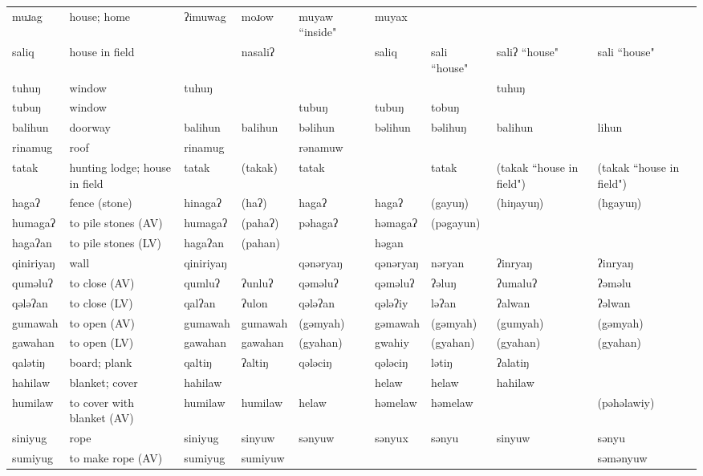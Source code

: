 \begin{landscape}
\begin{longtable}{*{9}{>{\raggedright\arraybackslash}p{}}}
\text{*}muɹag & house; home & ʔimuwag & moɹow & muyaw ``inside" & muyax &  &  & \\
\text{*}saliq & house in field &  & nasaliʔ &  & saliq & sali ``house" & saliʔ ``house" & sali ``house"\\
\text{*}tuhuŋ & window & tuhuŋ &  &  &  &  & tuhuŋ & \\
\text{*}tubuŋ & window &  &  & tubuŋ & tubuŋ & tobuŋ &  & \\
\text{*}balihun & doorway & balihun & balihun & bəlihun & bəlihun & bəlihuŋ & balihun & lihun\\
\text{*}rinamug & roof & rinamug &  & rənamuw &  &  &  & \\
\text{*}tatak & hunting lodge; house in field & tatak & (takak) & tatak &  & tatak & (takak ``house in field") & (takak ``house in field")\\
\text{*}hagaʔ & fence (stone) & hinagaʔ & (haʔ) & hagaʔ & hagaʔ & (gayuŋ) & (hiŋayuŋ) & (hgayuŋ)\\
\text{*}humagaʔ & to pile stones (AV) & humagaʔ & (pahaʔ) & pəhagaʔ & həmagaʔ & (pəgayun) &  & \\
\text{*}hagaʔan & to pile stones (LV) & hagaʔan & (pahan) &  & həgan &  &  & \\
\text{*}qiniriyaŋ & wall & qiniriyaŋ &  & qənəryaŋ & qənəryaŋ & nəryan & ʔinryaŋ & ʔinryaŋ\\
\text{*}quməluʔ & to close (AV) & qumluʔ & ʔunluʔ & qəməluʔ & qəməluʔ & ʔəluŋ & ʔumaluʔ & ʔəməlu\\
\text{*}qələʔan & to close (LV) & qalʔan & ʔulon & qələʔan & qələʔiy & ləʔan & ʔalwan & ʔəlwan\\
\text{*}gumawah & to open (AV) & gumawah & gumawah & (gəmyah) & gəmawah & (gəmyah) & (gumyah) & (gəmyah)\\
\text{*}gawahan & to open (LV) & gawahan & gawahan & (gyahan) & gwahiy & (gyahan) & (gyahan) & (gyahan)\\
\text{*}qalətiŋ & board; plank & qaltiŋ & ʔaltiŋ & qələciŋ & qələciŋ & lətiŋ & ʔalatiŋ & \\
\text{*}hahilaw & blanket; cover & hahilaw &  &  & helaw & helaw & hahilaw & \\
\text{*}humilaw & to cover with blanket (AV) & humilaw & humilaw & helaw & həmelaw & həmelaw &  & (pəhəlawiy)\\
\text{*}siniyug & rope & siniyug & sinyuw & sənyuw & sənyux & sənyu & sinyuw & sənyu\\
\text{*}sumiyug & to make rope (AV) & sumiyug & sumiyuw &  &  &  &  & səmənyuw\\

\end{longtable}
\end{landscape}
